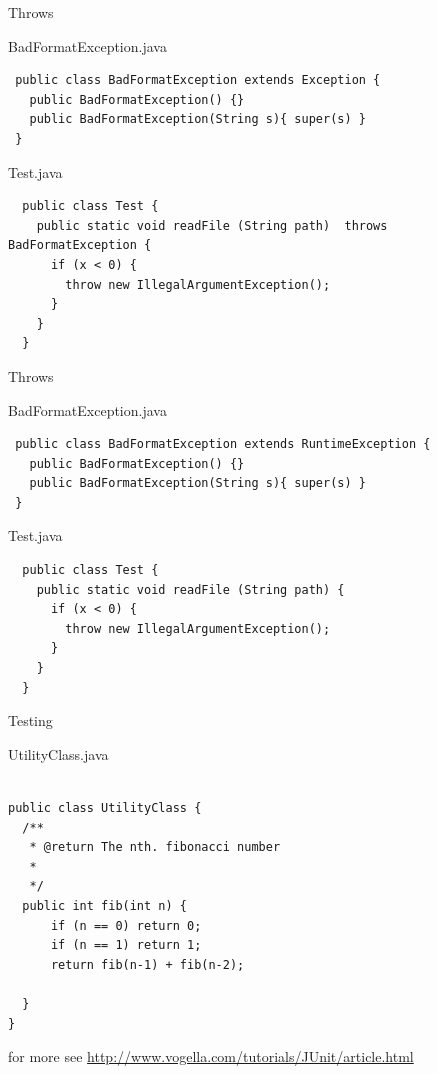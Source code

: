 \documentclass[18pt]{beamer}
\begin{document}
\begin{frame}[fragile]{Throws}
\begin{exampleblock}{BadFormatException.java}
 

\begin{lstlisting}
 public class BadFormatException extends Exception {
   public BadFormatException() {}
   public BadFormatException(String s){ super(s) }
 }
\end{lstlisting}
\end{exampleblock}
\begin{exampleblock}{Test.java}
 \begin{lstlisting}
  public class Test {
    public static void readFile (String path)  throws BadFormatException {
      if (x < 0) {
        throw new IllegalArgumentException();
      }
    }
  }
 \end{lstlisting}
\end{exampleblock}
\end{frame}



\begin{frame}[fragile]{Throws}
\begin{exampleblock}{BadFormatException.java}
 

\begin{lstlisting}
 public class BadFormatException extends RuntimeException {
   public BadFormatException() {}
   public BadFormatException(String s){ super(s) }
 }
\end{lstlisting}
\end{exampleblock}
\begin{exampleblock}{Test.java}
 \begin{lstlisting}
  public class Test {
    public static void readFile (String path) {
      if (x < 0) {
        throw new IllegalArgumentException();
      }
    }
  }
 \end{lstlisting}
\end{exampleblock}
\end{frame}

\begin{frame}[fragile]{Testing}
\begin{exampleblock}{UtilityClass.java}
 \begin{lstlisting}
  
public class UtilityClass {
  /**
   * @return The nth. fibonacci number
   * 
   */
  public int fib(int n) {
	  if (n == 0) return 0;
	  if (n == 1) return 1;
	  return fib(n-1) + fib(n-2);
	  
  }
}
 \end{lstlisting}
 \end{exampleblock}
for more see \url{http://www.vogella.com/tutorials/JUnit/article.html}
\end{frame}
\end{document}
